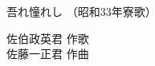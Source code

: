 \documentclass[10pt,b5j]{tarticle} %
\begin{document}
\begin{minipage}[c]{0.7\hsize} %
    \begin{center}
        {\LARGE
            吾れ憧れし %
        }
        {\small 
            （昭和33年寮歌） %
        }
    \end{center}
\end{minipage}
\begin{minipage}[c]{0.3\hsize} %
    \begin{flushright} %
        佐伯政英君 作歌\\佐藤一正君 作曲 %
    \end{flushright}
\end{minipage}
\end{document}
